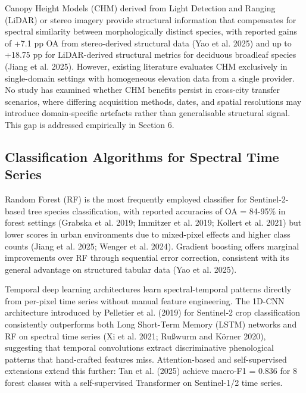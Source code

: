 \documentclass[11pt,a4paper]{scrartcl}
\begin{document}
Canopy Height Models (CHM) derived from Light Detection and Ranging
(LiDAR) or stereo imagery provide structural information that
compensates for spectral similarity between morphologically distinct
species, with reported gains of +7.1 pp OA from stereo-derived
structural data (Yao et al. 2025) and up to +18.75 pp for LiDAR-derived
structural metrics for deciduous broadleaf species (Jiang et al. 2025).
However, existing literature evaluates CHM exclusively in single-domain
settings with homogeneous elevation data from a single provider. No
study has examined whether CHM benefits persist in cross-city transfer
scenarios, where differing acquisition methods, dates, and spatial
resolutions may introduce domain-specific artefacts rather than
generalisable structural signal. This gap is addressed empirically in
Section 6.

\subsection{Classification Algorithms for Spectral Time
Series}\label{classification-algorithms-for-spectral-time-series}

Random Forest (RF) is the most frequently employed classifier for
Sentinel-2-based tree species classification, with reported accuracies
of OA = 84-95\% in forest settings (Grabska et al. 2019; Immitzer et al.
2019; Kollert et al. 2021) but lower scores in urban environments due to
mixed-pixel effects and higher class counts (Jiang et al. 2025; Wenger
et al. 2024). Gradient boosting offers marginal improvements over RF
through sequential error correction, consistent with its general
advantage on structured tabular data (Yao et al. 2025).

Temporal deep learning architectures learn spectral-temporal patterns
directly from per-pixel time series without manual feature engineering.
The 1D-CNN architecture introduced by Pelletier et al. (2019) for
Sentinel-2 crop classification consistently outperforms both Long
Short-Term Memory (LSTM) networks and RF on spectral time series (Xi et
al. 2021; Rußwurm and Körner 2020), suggesting that temporal
convolutions extract discriminative phenological patterns that
hand-crafted features miss. Attention-based and self-supervised
extensions extend this further: Tan et al. (2025) achieve macro-F1 =
0.836 for 8 forest classes with a self-supervised Transformer on
Sentinel-1/2 time series.
\end{document}
